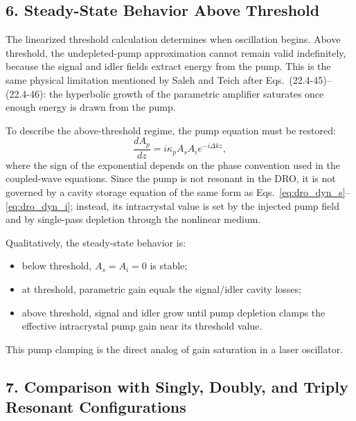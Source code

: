 \begin{resolucao}[Solution]
\subsection*{6. Steady-State Behavior Above Threshold}

    The linearized threshold calculation determines when oscillation begins. Above threshold, the undepleted-pump approximation cannot remain valid indefinitely, because the signal and idler fields extract energy from the pump. This is the same physical limitation mentioned by Saleh and Teich after Eqs.~(22.4-45)--(22.4-46): the hyperbolic growth of the parametric amplifier saturates once enough energy is drawn from the pump.

    To describe the above-threshold regime, the pump equation must be restored:
    \begin{equation}
        \frac{dA_p}{dz}
        =
        i\kappa_p A_sA_i e^{-i\Delta kz},
        \label{eq:pump_depletion_local}
    \end{equation}
    where the sign of the exponential depends on the phase convention used in the coupled-wave equations. Since the pump is not resonant in the DRO, it is not governed by a cavity storage equation of the same form as Eqs.~\eqref{eq:dro_dyn_s}--\eqref{eq:dro_dyn_i}; instead, its intracrystal value is set by the injected pump field and by single-pass depletion through the nonlinear medium.

    Qualitatively, the steady-state behavior is:
    \begin{itemize}
        \item below threshold, $A_s=A_i=0$ is stable;
        \item at threshold, parametric gain equals the signal/idler cavity losses;
        \item above threshold, signal and idler grow until pump depletion clamps the effective intracrystal pump gain near its threshold value.
    \end{itemize}
    This pump clamping is the direct analog of gain saturation in a laser oscillator.

\subsection*{7. Comparison with Singly, Doubly, and Triply Resonant Configurations}


\end{resolucao}

